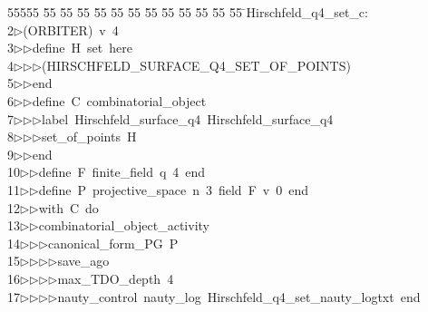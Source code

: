 %
%
\begin{tabbing}
55555 \= 55 \= 55 \= 55 \= 55 \= 55 \= 55 \= 55 \= 55 \= 55 \= 55 \= 55 \= 55 \= \>Hirschfeld\_q4\_set\_c:\\[0pt]
2\>$\triangleright$\>(ORBITER)\ v\ 4\ \\[0pt]
3\>$\triangleright$\>$\triangleright$\>define\ H\ set\ here\ \\[0pt]
4\>$\triangleright$\>$\triangleright$\>$\triangleright$\>(HIRSCHFELD\_SURFACE\_Q4\_SET\_OF\_POINTS)\ \\[0pt]
5\>$\triangleright$\>$\triangleright$\>end\ \\[0pt]
6\>$\triangleright$\>$\triangleright$\>define\ C\ combinatorial\_object\ \\[0pt]
7\>$\triangleright$\>$\triangleright$\>$\triangleright$\>label\ Hirschfeld\_surface\_q4\ Hirschfeld\_surface\_q4\ \\[0pt]
8\>$\triangleright$\>$\triangleright$\>$\triangleright$\>set\_of\_points\ H\ \\[0pt]
9\>$\triangleright$\>$\triangleright$\>end\ \\[0pt]
10\>$\triangleright$\>$\triangleright$\>define\ F\ finite\_field\ q\ 4\ end\ \\[0pt]
11\>$\triangleright$\>$\triangleright$\>define\ P\ projective\_space\ n\ 3\ field\ F\ v\ 0\ end\ \\[0pt]
12\>$\triangleright$\>$\triangleright$\>with\ C\ do\ \\[0pt]
13\>$\triangleright$\>$\triangleright$\>combinatorial\_object\_activity\ \\[0pt]
14\>$\triangleright$\>$\triangleright$\>$\triangleright$\>canonical\_form\_PG\ P\ \\[0pt]
15\>$\triangleright$\>$\triangleright$\>$\triangleright$\>$\triangleright$\>save\_ago\ \\[0pt]
16\>$\triangleright$\>$\triangleright$\>$\triangleright$\>$\triangleright$\>max\_TDO\_depth\ 4\ \\[0pt]
17\>$\triangleright$\>$\triangleright$\>$\triangleright$\>$\triangleright$\>nauty\_control\ nauty\_log\ Hirschfeld\_q4\_set\_nauty\_logtxt\ end\ \\[0pt]

\end{tabbing}
